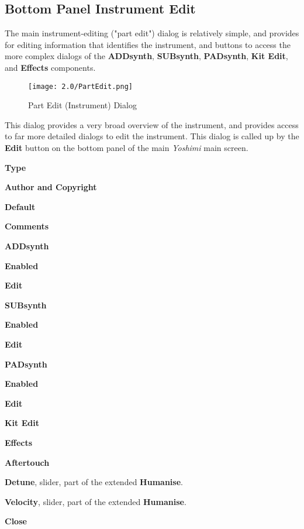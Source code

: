 \subsection{Bottom Panel Instrument Edit}
\label{subsec:bottom_panel_instrument_edit}

   The main instrument-editing ("part edit")
   dialog is relatively simple, and provides for
   editing information that identifies the instrument, and buttons to access
   the more complex dialogs of the
   \textbf{ADDsynth}, \textbf{SUBsynth}, \textbf{PADsynth}, \textbf{Kit Edit},
   and \textbf{Effects} components.


\begin{figure}[H]
   \centering
   \texttt{[image: 2.0/PartEdit.png]}
   \caption{Part Edit (Instrument) Dialog}
   \label{fig:instrument_edit_dialog}
\end{figure}

   This dialog provides a very broad overview of the instrument, and
   provides access to far more detailed dialogs to edit the instrument.
   This dialog is called up by the \textbf{Edit} button on the bottom panel
   of the main \textsl{Yoshimi} main screen.

   \begin{enumber}
      \item \textbf{Type}
      \item \textbf{Author and Copyright}
      \item \textbf{Default}
      \item \textbf{Comments}
      \item \textbf{ADDsynth}
      \begin{enumber}
         \item \textbf{Enabled}
         \item \textbf{Edit}
      \end{enumber}
      \item \textbf{SUBsynth}
      \begin{enumber}
         \item \textbf{Enabled}
         \item \textbf{Edit}
      \end{enumber}
      \item \textbf{PADsynth}
      \begin{enumber}
         \item \textbf{Enabled}
         \item \textbf{Edit}
      \end{enumber}
      \item \textbf{Kit Edit}
      \item \textbf{Effects}
      \item \textbf{Aftertouch}
      \item \textbf{Detune}, slider, part of the extended \textbf{Humanise}.
      \item \textbf{Velocity}, slider, part of the extended \textbf{Humanise}.
      \item \textbf{Close}
   \end{enumber}

